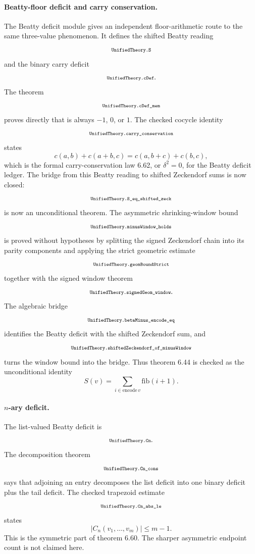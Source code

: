 \documentclass[11pt]{article}
\newcommand{\lean}[1]{\relax\ifmmode\hbox{\scriptsize\ttfamily\detokenize{#1}}\else{\small\texttt{\detokenize{#1}}}\fi}
\begin{document}
\paragraph{Beatty-floor deficit and carry conservation.}
The Beatty deficit module gives an independent floor-arithmetic route to the same three-value phenomenon.  It defines the shifted Beatty reading
$$
  \lean{UnifiedTheory.S}
$$
and the binary carry deficit
$$
  \lean{UnifiedTheory.cDef}.
$$
The theorem
$$
  \lean{UnifiedTheory.cDef_mem}
$$
proves directly that \lean{cDef a b} is always $-1$, $0$, or $1$.  The checked cocycle identity
$$
  \lean{UnifiedTheory.carry_conservation}
$$
states
$$
  c(a,b)+c(a+b,c)=c(a,b+c)+c(b,c),
$$
which is the formal carry-conservation law 6.62, or $\delta^2=0$, for the Beatty deficit ledger.  The bridge from this Beatty reading to shifted Zeckendorf sums is now closed:
$$
  \lean{UnifiedTheory.S_eq_shifted_zeck}
$$
is now an unconditional theorem.  The asymmetric shrinking-window bound
$$
  \lean{UnifiedTheory.minusWindow_holds}
$$
is proved without hypotheses by splitting the signed Zeckendorf chain into its parity components and applying the strict geometric estimate
$$
  \lean{UnifiedTheory.geomBoundStrict}
$$
together with the signed window theorem
$$
  \lean{UnifiedTheory.signedGeom_window}.
$$
The algebraic bridge
$$
  \lean{UnifiedTheory.betaMinus_encode_eq}
$$
identifies the Beatty deficit with the shifted Zeckendorf sum, and
$$
  \lean{UnifiedTheory.shiftedZeckendorf_of_minusWindow}
$$
turns the window bound into the bridge.  Thus theorem 6.44 is checked as the unconditional identity
$$
  S(v)=\sum_{i\in\mathrm{encode}\,v}\mathrm{fib}(i+1).
$$

\paragraph{$n$-ary deficit.}
The list-valued Beatty deficit is
$$
  \lean{UnifiedTheory.Cn}.
$$
The decomposition theorem
$$
  \lean{UnifiedTheory.Cn_cons}
$$
says that adjoining an entry decomposes the list deficit into one binary deficit plus the tail deficit.  The checked trapezoid estimate
$$
  \lean{UnifiedTheory.Cn_abs_le}
$$
states
$$
  |C_n(v_1,\ldots,v_m)|\le m-1.
$$
This is the symmetric part of theorem 6.60.  The sharper asymmetric endpoint count is not claimed here.
\end{document}
